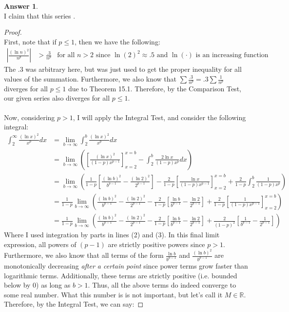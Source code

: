 \documentclass[10pt,a4paper]{article}
\theoremstyle{definition}
\newtheorem*{answer*}{Answer}
\begin{document}
\begin{answer*}{$ $}
\\I claim that this series .
\end{answer*}
\begin{proof}{$ $}
\\First, note that if $p \leq 1$, then we have the following:
\begin{align*}
\left|\frac{(\ln n)^2}{n^p}\right| &> \frac{.3}{n^p} &\text{for all $n > 2$ since $\ln(2)^2 \approx .5$ and $\ln(\cdot)$ is an increasing function}
\end{align*}
The $.3$ was arbitrary here, but was just used to get the proper inequality for all values of the summation. Furthermore, we also know that $\sum \frac{.3}{n^p} = .3 \sum \frac{1}{n^p}$ diverges for all $p \leq 1$ due to Theorem 15.1. Therefore, by the Comparison Test, our given series also diverges for all $p \leq 1$.
\\
\\Now, considering $p > 1$, I will apply the Integral Test, and consider the following integral:
\begin{align}
\int_{2}^{\infty} \frac{(\ln x)^2}{x^p} dx &= \lim_{b \to \infty} \int_2^b \frac{(\ln x)^2}{x^p} dx\\
&= \lim_{b \to \infty}\left( \left[\frac{(\ln x)^2}{(1-p)x^{p - 1}}\right]_{x = 2}^{x = b} - \int_2^b \frac{2\ln x}{(1 - p)x^{p}}dx\right)\\
&= \lim_{b \to \infty} \left(\frac{1}{1 - p}\left[ \frac{(\ln b)^2}{b^{p - 1}} - \frac{(\ln 2)^2}{2^{p - 1}}\right] - \frac{2}{1 - p}\left[\frac{\ln x}{(1 - p)x^{p - 1}}\right]_{x = 2}^{x = b} + \frac{2}{1 - p}\int_2^b \frac{1}{(1 - p)x^p} \right)\\
&= \frac{1}{1 - p}\lim_{b \to \infty} \left(\frac{(\ln b)^2}{b^{p - 1}} - \frac{(\ln 2)^2}{2^{p - 1}} - \frac{2}{1 - p}\left[\frac{\ln b}{b^{p - 1}} - \frac{\ln 2}{2^{p - 1}}\right] + \frac{2}{1 - p}\left[\frac{1}{(1-p)x^{p-1}}\right]_{x = 2}^{x = b}\right)\\
&= \frac{1}{1 - p}\lim_{b \to \infty} \left(\frac{(\ln b)^2}{b^{p - 1}} - \frac{(\ln 2)^2}{2^{p - 1}} - \frac{2}{1 - p}\left[\frac{\ln b}{b^{p - 1}} - \frac{\ln 2}{2^{p - 1}}\right] + \frac{2}{(1 - p)^2}\left[\frac{1}{b^{p - 1}} - \frac{1}{2^{p - 1}}\right] \right)
\end{align}
Where I used integration by parts in lines (2) and (3). In this final limit expression, all powers of $(p - 1)$ are strictly positive powers since $p > 1$. Furthermore, we also know that all terms of the form $\frac{\ln b}{b^{p - 1}}$ and $\frac{(\ln b)^2}{b^{p - 1}}$ are monotonically decreasing \textit{after a certain point} since power terms grow faster than logarithmic terms. Additionally, these terms are strictly positive (i.e. bounded below by 0) as long as $b > 1$. Thus, all the above terms do indeed converge to some real number. What this number is is not important, but let's call it $M \in \mathbb{R}$. Therefore, by the Integral Test, we can say:

\end{proof}
\end{document}
